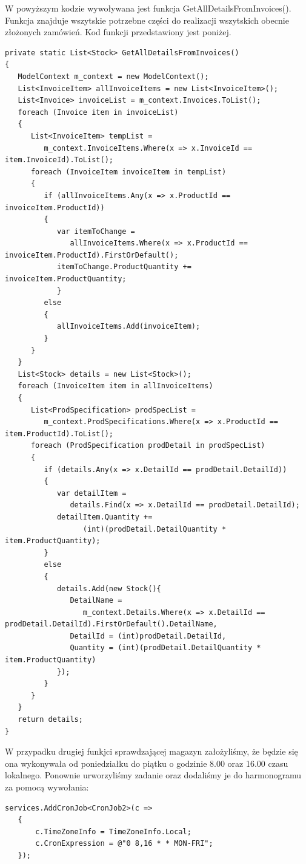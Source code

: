 \documentclass{article}
\begin{document}
W powyższym kodzie wywoływana jest funkcja GetAllDetailsFromInvoices(). Funkcja znajduje wszytskie
potrzebne części do realizacji wszytskich obecnie złożonych zamówień. Kod funkcji przedstawiony jest
poniżej.
\begin{lstlisting}[style=sharpc,caption={Funkcja GetAllDetailsFromInvoices()},breaklines=true]
private static List<Stock> GetAllDetailsFromInvoices()
{
   ModelContext m_context = new ModelContext();
   List<InvoiceItem> allInvoiceItems = new List<InvoiceItem>();
   List<Invoice> invoiceList = m_context.Invoices.ToList();
   foreach (Invoice item in invoiceList)
   {
      List<InvoiceItem> tempList = 
         m_context.InvoiceItems.Where(x => x.InvoiceId == item.InvoiceId).ToList();
      foreach (InvoiceItem invoiceItem in tempList)
      {
         if (allInvoiceItems.Any(x => x.ProductId == invoiceItem.ProductId))
         {
            var itemToChange = 
               allInvoiceItems.Where(x => x.ProductId == invoiceItem.ProductId).FirstOrDefault();
            itemToChange.ProductQuantity += invoiceItem.ProductQuantity;
            }
         else
         {
            allInvoiceItems.Add(invoiceItem);
         }
      }
   }
   List<Stock> details = new List<Stock>();
   foreach (InvoiceItem item in allInvoiceItems)
   {
      List<ProdSpecification> prodSpecList = 
         m_context.ProdSpecifications.Where(x => x.ProductId == item.ProductId).ToList();
      foreach (ProdSpecification prodDetail in prodSpecList)
      {
         if (details.Any(x => x.DetailId == prodDetail.DetailId))
         {
            var detailItem = 
               details.Find(x => x.DetailId == prodDetail.DetailId);
            detailItem.Quantity += 
                  (int)(prodDetail.DetailQuantity * item.ProductQuantity);
         }
         else
         {
            details.Add(new Stock(){
               DetailName = 
                  m_context.Details.Where(x => x.DetailId == prodDetail.DetailId).FirstOrDefault().DetailName,
               DetailId = (int)prodDetail.DetailId,
               Quantity = (int)(prodDetail.DetailQuantity * item.ProductQuantity)
            });
         }
      }
   }
   return details;
}
\end{lstlisting}
W przypadku drugiej funkjci sprawdzającej magazyn założyliśmy, że będzie się ona wykonywała od
poniedziałku do piątku o godzinie 8.00 oraz 16.00 czasu lokalnego. Ponownie urworzyliśmy zadanie
oraz dodaliśmy je do harmonogramu za pomocą wywołania:
\begin{lstlisting}[style=sharpc,caption={Dodanie zadania do harmonogramu}]
   services.AddCronJob<CronJob2>(c =>
   {
       c.TimeZoneInfo = TimeZoneInfo.Local;
       c.CronExpression = @"0 8,16 * * MON-FRI";
   });
\end{lstlisting}
\end{document}
